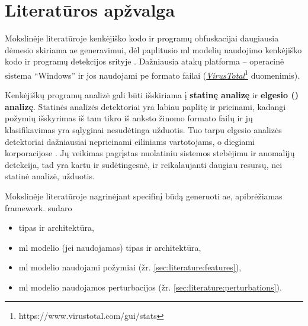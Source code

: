 \section{Literatūros apžvalga}\label{sec:literature}

Mokslinėje literatūroje kenkėjiško kodo ir programų obfuskacijai daugiausia dėmesio skiriama \ac{ae} generavimui, dėl paplitusio \acs{ml} modelių naudojimo kenkėjiško kodo ir programų detekcijos srityje \cite{andersonLearningEvadeStatic2018}. Dažniausia atakų platforma -- operacinė sistema \enquote{Windows} ir jos naudojami \acs{pe} formato failai (\href{https://www.virustotal.com/gui/stats}{\textit{VirusTotal}}\footnote{https://www.virustotal.com/gui/stats} duomenimis).

Kenkėjiškų programų analizė gali būti išskiriama į \textbf{statinę analizę} ir \textbf{elgesio () analizę}. Statinės analizės detektoriai yra labiau paplitę ir prieinami, kadangi požymių išskyrimas iš tam tikro iš anksto žinomo formato failų ir jų klasifikavimas yra sąlyginai nesudėtinga užduotis. Tuo tarpu elgesio analizės detektoriai dažniausiai neprieinami eiliniams vartotojams, o diegiami korporacijose \cite{rosenbergGenericBlackBoxEndEnd2018}. Jų veikimas pagrįstas nuolatiniu sistemos stebėjimu ir anomalijų detekcija, tad yra kartu ir sudėtingesnė, ir reikalaujanti daugiau resursų, nei statinė analizė, užduotis.

Mokslinėje literatūroje nagrinėjant specifinį būdą generuoti \acs{ae}, apibrėžiamas \gls{framework}.  sudaro
\begin{itemize}
    \item {} tipas ir architektūra,
    \item \acs{ml} modelio (jei naudojamas) tipas ir architektūra,
    \item \acs{ml} modelio naudojami požymiai (žr. \ref{sec:literature:features}),
    \item \acs{ml} modelio naudojamos perturbacijos (žr. \ref{sec:literature:perturbations}).
\end{itemize}







